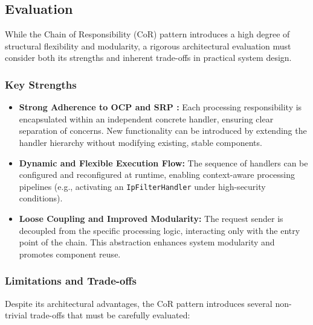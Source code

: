 \subsection{Evaluation}

While the Chain of Responsibility (CoR) pattern introduces a high degree of structural flexibility and modularity, a rigorous architectural evaluation must consider both its strengths and inherent trade-offs in practical system design.

\subsubsection{Key Strengths}
\begin{itemize}
    \item \textbf{Strong Adherence to OCP and SRP \cite{martin2000design}:} Each processing responsibility is encapsulated within an independent concrete handler, ensuring clear separation of concerns. New functionality can be introduced by extending the handler hierarchy without modifying existing, stable components.
    
    \item \textbf{Dynamic and Flexible Execution Flow:} The sequence of handlers can be configured and reconfigured at runtime, enabling context-aware processing pipelines (e.g., activating an \texttt{IpFilterHandler} under high-security conditions).
    
    \item \textbf{Loose Coupling and Improved Modularity:} The request sender is decoupled from the specific processing logic, interacting only with the entry point of the chain. This abstraction enhances system modularity and promotes component reuse.
\end{itemize}

\subsubsection{Limitations and Trade-offs}
Despite its architectural advantages, the CoR pattern introduces several non-trivial trade-offs that must be carefully evaluated:

